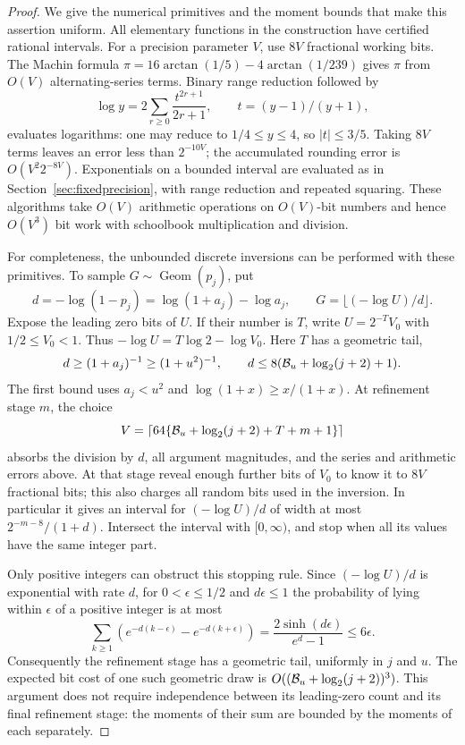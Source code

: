 \begin{proof}
We give the numerical primitives and the moment bounds that
make this assertion uniform. All elementary functions in the
construction have certified rational intervals. For a precision
parameter $V$, use $8V$ fractional working bits.
The Machin formula
$\pi=16\arctan(1/5)-4\arctan(1/239)$ gives $\pi$ from
$O(V)$ alternating-series terms. Binary range reduction followed
by
\[
 \log y=2\sum_{r\ge0}\frac{t^{2r+1}}{2r+1},
 \qquad t=(y-1)/(y+1),
\]
evaluates logarithms: one may reduce to $1/4\le y\le4$, so
$|t|\le3/5$. Taking $8V$ terms leaves an error less than
$2^{-10V}$; the accumulated rounding error is
$O(V^2 2^{-8V})$. Exponentials on a bounded interval are evaluated
as in Section~\ref{sec:fixedprecision}, with range reduction and
repeated squaring. These algorithms take $O(V)$ arithmetic
operations on $O(V)$-bit numbers and hence $O(V^3)$ bit work
with schoolbook multiplication and division.

For completeness, the unbounded discrete inversions can be
performed with these primitives. To sample
$G\sim\operatorname{Geom}(p_j)$, put
\[
 d=-\log(1-p_j)=\log(1+a_j)-\log a_j,
 \qquad G=\lfloor(-\log U)/d\rfloor.
\]
Expose the leading zero bits of $U$. If their number is $T$,
write $U=2^{-T}V_0$ with $1/2\le V_0<1$.
Thus $-\log U=T\log2-\log V_0$.
Here $T$ has a geometric tail,
\[
 d\ge(1+a_j)^{-1}\ge(1+u^2)^{-1},
 \qquad
 d\le 8(\mathcal B_u+\log_2(j+2)+1).
\]
The first bound uses $a_j<u^2$ and
$\log(1+x)\ge x/(1+x)$.
At refinement stage $m$, the choice
\[
 V=\left\lceil64\{\mathcal B_u+\log_2(j+2)+T+m+1\}\right\rceil
\]
absorbs the division by $d$, all argument magnitudes, and the
series and arithmetic errors above. At that stage reveal enough
further bits of $V_0$ to know it to $8V$ fractional bits; this
also charges all random bits used in the inversion. In particular it gives an
interval for $(-\log U)/d$ of width at most
$2^{-m-8}/(1+d)$. Intersect the interval with $[0,\infty)$,
and stop when all its values have the same integer part.

Only positive integers can obstruct this stopping rule.
Since $(-\log U)/d$ is exponential with rate $d$, for
$0<\epsilon\le1/2$ and $d\epsilon\le1$ the probability of
lying within $\epsilon$ of a positive integer is at most
\[
 \sum_{k\ge1}\!
 \left(e^{-d(k-\epsilon)}-e^{-d(k+\epsilon)}\right)
 =\frac{2\sinh(d\epsilon)}{e^d-1}
 \le 6\epsilon.
\]
Consequently the refinement stage has a geometric tail,
uniformly in $j$ and $u$. The expected bit cost of one such
geometric draw is
$O((\mathcal B_u+\log_2(j+2))^3)$.
This argument does not require independence between its
leading-zero count and its final refinement stage: the moments
of their sum are bounded by the moments of each separately.


\end{proof}
